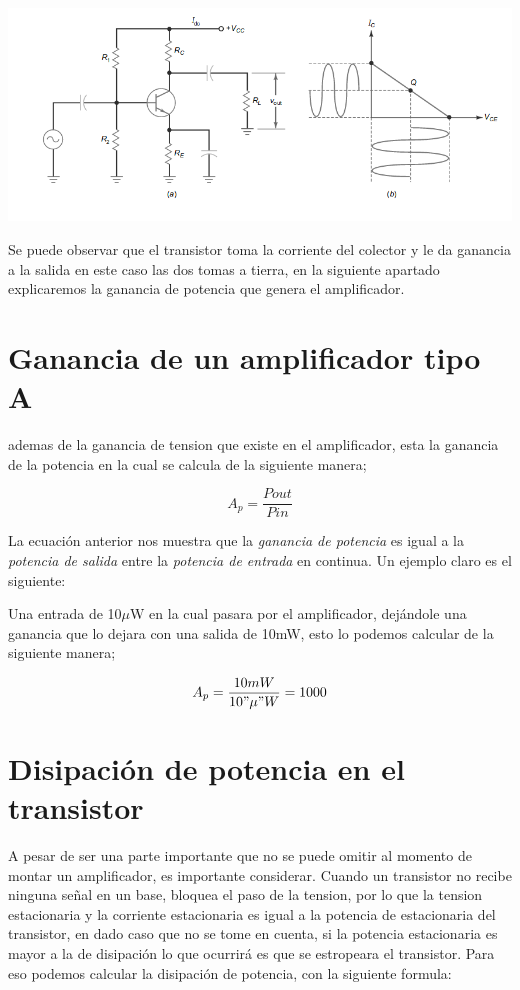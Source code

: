 \documentclass[11pt,a4paper]{article}
\begin{document}
\begin{center}
\includegraphics[scale=0.5]{1.png}
\end{center}

Se puede observar que el transistor toma la corriente del colector y le da ganancia a la salida en este caso las dos tomas a tierra, en la siguiente apartado explicaremos la ganancia de potencia que genera el amplificador.

\section{Ganancia de un amplificador tipo A}
ademas de la ganancia de tension que existe en el amplificador, esta la ganancia de la potencia en la cual se calcula de la siguiente manera; 


\begin{equation}
A_p=\frac{Pout}{Pin}
\end{equation}

La ecuación anterior nos muestra que la  \emph{ganancia de potencia} es igual a la \emph{potencia de salida} entre la \emph{potencia de entrada} en continua. Un ejemplo claro es el siguiente:

Una entrada de 10$\mu$W en la cual pasara por el amplificador, dejándole una ganancia que lo dejara con una salida de 10mW, esto lo podemos calcular de la siguiente manera;

\begin{equation}
A_p=\frac{10mW}{10"\mu"W}=1000
\end{equation}

\newpage

\section{Disipación de potencia en el transistor}

A pesar de ser una parte importante que no se puede omitir al momento de montar un amplificador, es importante considerar. Cuando un transistor no recibe ninguna señal en un base, bloquea el paso de la tension, por lo que la tension estacionaria y la corriente estacionaria es igual a la potencia de estacionaria del  transistor, en dado caso que no se tome en cuenta, si la potencia estacionaria es mayor a la de disipación lo que ocurrirá es que se estropeara el transistor. Para eso podemos calcular la disipación de potencia, con la siguiente formula:
\end{document}

